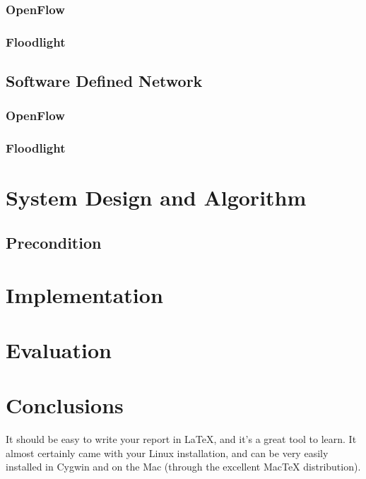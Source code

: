 \documentclass[11pt]{article}
\begin{document}
\subsubsection{OpenFlow}
\subsubsection{Floodlight}

\subsection{Software Defined Network}
\subsubsection{OpenFlow}
\subsubsection{Floodlight}

\section{System Design and Algorithm}
\subsection{Precondition}

\section{Implementation}

\section{Evaluation}

\section{Conclusions}

It should be easy to write your report in LaTeX, and it's a great tool
to learn. It almost certainly came with your Linux installation, and
can be very easily installed in Cygwin and on the Mac (through the
excellent MacTeX distribution).
\end{document}
